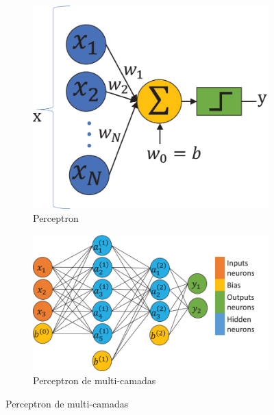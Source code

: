\begin{figure}
	\centering
	\caption{Arquiteturas do Perceptron}
	\label{fig:perceptrons}
	\begin{subfigure}[b]{0.3\textwidth}
		\includegraphics[width=\textwidth]{figs/perceptron}
		\caption{Perceptron}
		\label{fig:perceptron}
	\end{subfigure}
	\qquad\qquad
	\begin{subfigure}[b]{0.3\textwidth}
		\includegraphics[width=\textwidth]{figs/mlp}
		\caption{Perceptron de multi-camadas}
		\label{fig:mlp}
	\end{subfigure}
\end{figure}

